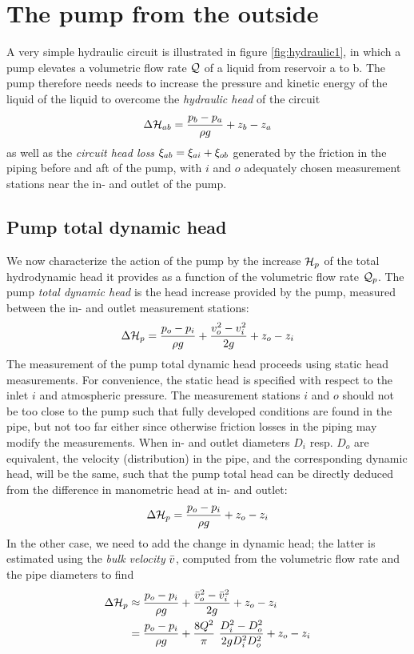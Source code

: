 
\section{The pump from the outside}



A very simple hydraulic circuit is illustrated in figure
\ref{fig:hydraulic1}, in which a pump elevates a volumetric flow rate
$\mathcal Q$ of a liquid from reservoir a to b. The pump therefore needs
needs to increase the pressure and kinetic energy of the liquid of the
liquid to overcome the \emph{hydraulic head} of the circuit 
\begin{align*}
  \Delta \mathcal H_{ab} = \frac{p_b - p_a}{\rho g} + z_b - z_a
\end{align*} as well as the \emph{circuit head loss} $\xi_{ab} =
\xi_{ai} + \xi_{ob}$ generated by the friction in the piping
before and aft of the pump, with $i$ and $o$ adequately chosen
measurement stations near the in- and outlet of the pump.

\subsection{Pump total dynamic head}

We now characterize the action of the pump by the increase $\mathcal H_p$
of the total hydrodynamic head it provides as a function of the
volumetric flow rate $\mathcal Q_p$. The pump \emph{total dynamic head} is
the head increase provided by the pump, measured between the in- and
outlet measurement stations:
\begin{align*}
  \Delta \mathcal H_p = \frac{p_o - p_i}{\rho g} +
  \frac{v_o^2 - v_i^2}{2g} + z_o - z_i
\end{align*}
The measurement of the pump total dynamic head proceeds using static
head measurements. For convenience, the static head is specified with
respect to the inlet $i$ and atmospheric pressure. The measurement
stations $i$ and $o$ should not be too close to the pump such that
fully developed conditions are found in the pipe, but not too far
either since otherwise friction losses in the piping may modify the
measurements. When in- and outlet diameters $D_i$ resp. $D_o$ are
equivalent, the velocity (distribution) in the pipe, and the
corresponding dynamic head, will be the same, such that the pump total
head can be directly deduced from the difference in manometric head at
in- and outlet:
\begin{align*}
  \Delta \mathcal H_p = \frac{p_o - p_i}{\rho g} + z_o - z_i
\end{align*}
In the other case, we need to add the change in dynamic head; the
latter is estimated using the \emph{bulk velocity} $\bar {v}$, computed
from the volumetric flow rate and the pipe diameters to find
\begin{align*}
  \Delta \mathcal H_p 
  &\approx 
  \frac{p_o - p_i}{\rho g} +
  \frac{\bar {v}_o^2 - \bar {v}_{i}^2}{2g} + 
  z_o - z_i \\
  &= 
  \frac{p_o - p_i}{\rho g} + 
  \frac{8 Q^2}{\pi}~\frac{D_i^2 - D_o^2}{2 g D_i^2 D_o^2} + 
  z_o - z_i
\end{align*}

